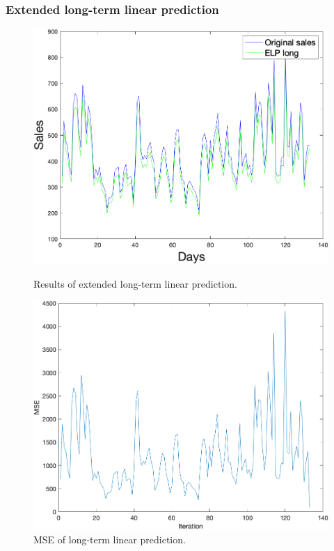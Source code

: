         \subsubsection{Extended long-term linear prediction} \label{subsec:res_eltlp}
        \begin{figure}[h]
            \centering
            \begin{minipage}{0.45\textwidth}
                \centering
                \includegraphics[width=1\textwidth]{figures/expELTLP.png}
                \caption{Results of extended long-term linear prediction.}
                \label{fig:eltlpres}
            \end{minipage}\hfill
            \begin{minipage}{0.45\textwidth}
                \centering
                \includegraphics[width=1\textwidth]{figures/expMseELTLP.png}
                \caption{MSE of long-term linear prediction.}
                \label{fig:eltlpmse}
            \end{minipage}
        \end{figure}
        \newpage
